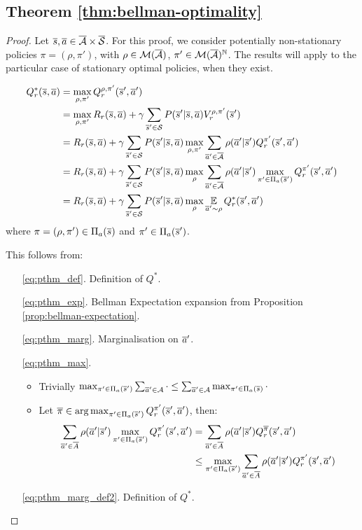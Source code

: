 \subsection{Theorem \ref{thm:bellman-optimality}}

\begin{proof}
Let $\overline{s}, \overline{a} \in \overline{\mathcal{A}}\times\overline{\mathcal{S}}$. For this proof, we consider  potentially non-stationary policies $\pi=(\rho, \pi')$, with $\rho\in\mathcal{M}(\overline{\mathcal{A}})$, $\pi'\in\mathcal{M}(\overline{\mathcal{A}})^{\mathbb{N}}$. The results will apply to the particular case of stationary optimal policies, when they exist.

\begin{align}
    Q_r^*(\overline{s}, \overline{a}) &=  \max_{\rho, \pi'} Q_r^{\rho, \pi'}(\overline{s}', \overline{a}') \label{eq:pthm_def}\\
    &= \max_{\rho, \pi'} R_r(\overline{s}, \overline{a}) + \gamma \sum_{\overline{s}'\in\mathcal{S}} P(\overline{s}' | \overline{s}, \overline{a}) V_r^{\rho, \pi'}(\overline{s}') \label{eq:pthm_exp}\\
    &= R_r(\overline{s}, \overline{a}) + \gamma \sum_{\overline{s}'\in\mathcal{S}}  P(\overline{s}' | \overline{s}, \overline{a}) \max_{\rho, \pi'} \sum_{\overline{a}'\in\overline{\mathcal{A}}} \rho(\overline{a}' | \overline{s}')Q_r^{\pi'}(\overline{s}', \overline{a}') \label{eq:pthm_marg}\\
    &= R_r(\overline{s}, \overline{a}) + \gamma \sum_{\overline{s}'\in\mathcal{S}}  P(\overline{s}' | \overline{s}, \overline{a}) \max_\rho\sum_{\overline{a}'\in\overline{\mathcal{A}}}\rho(\overline{a}' | \overline{s}')\max_{\pi'\in\Pi_a(\overline{s}')}Q_r^{\pi'}(\overline{s}', \overline{a}') \label{eq:pthm_max}\\
    &= R_r(\overline{s}, \overline{a}) + \gamma \sum_{\overline{s}'\in\mathcal{S}}  P(\overline{s}' | \overline{s}, \overline{a}) \max_\rho\operatorname*{\mathbb{E}}\limits_{\overline{a}'\sim\rho}Q_r^*(\overline{s}', \overline{a}') \label{eq:pthm_marg_def2}
\end{align}
where $\pi = (\rho, \pi')\in\Pi_a(\overline{s})$ and $\pi'\in\Pi_a(\overline{s}')$.

This follows from:
\begin{enumerate}
\item[\eqref{eq:pthm_def}.] Definition of $Q^*$. 
\item[\eqref{eq:pthm_exp}.] Bellman Expectation expansion from Proposition \ref{prop:bellman-expectation}.
\item[\eqref{eq:pthm_marg}.] Marginalisation on $\overline{a}'$.
\item[\eqref{eq:pthm_max}.] \begin{itemize}
    \item Trivially $\max_{\pi'\in\Pi_a(\overline{s}')} \sum_{\overline{a}'\in\mathcal{A}} \cdot \leq \sum_{\overline{a}'\in\mathcal{A}} \max_{ \pi'\in\Pi_a(\overline{s})} \cdot$
    \item Let $\overline{\pi}\in\operatorname*{arg\,max}_{\pi'\in\Pi_a(\overline{s}')} Q_r^{\pi'}(\overline{s}', \overline{a}')$, then:
    \begin{align*}
        \sum_{\overline{a}'\in\overline{A}}\rho(\overline{a}'|\overline{s}')\max_{\pi'\in\Pi_a(\overline{s}')}Q_r^{\pi'}(\overline{s}', \overline{a}') &= \sum_{\overline{a}'\in\overline{A}}\rho(\overline{a}'|\overline{s}')Q_r^{\overline{\pi}}(\overline{s}', \overline{a}') \\
        &\leq  \max_{\pi'\in\Pi_a(\overline{s}')} \sum_{\overline{a}'\in\overline{A}}\rho(\overline{a}'|\overline{s}')Q_r^{\pi'}(\overline{s}', \overline{a}')
    \end{align*}
\end{itemize}
\item[\eqref{eq:pthm_marg_def2}.] Definition of $Q^*$.
\end{enumerate}


\end{proof}
